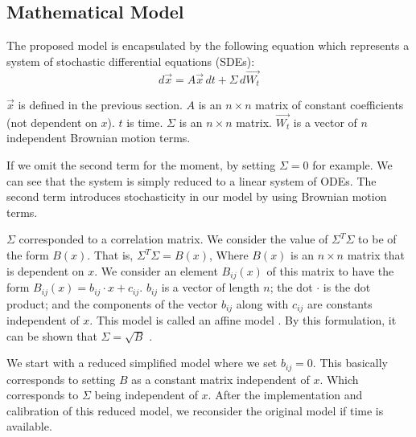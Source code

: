 \subsection{Mathematical Model}
\label{sec:model}
The proposed model is encapsulated by the following equation which represents a system of stochastic differential equations (SDEs):
\begin{equation}
\label{eq:model}
d\vec{x} = A \vec{x} \, dt + \Sigma \, d\vec{W_t}
\end{equation}

$\vec{x}$  is defined in the previous section.
$A$ is an $n \times n$ matrix of constant coefficients (not dependent on $x$).
$t$ is time.
$\Sigma$ is an $n \times n$ matrix.
$\vec{W_t}$ is a vector of $n$ independent Brownian motion terms.

If we omit the second term for the moment,
by setting $\Sigma = 0$ for example.
We can see that the system is simply reduced to a linear system of ODEs.
The second term introduces stochasticity in our model by using Brownian motion terms.

$\Sigma$ corresponded to a correlation matrix.
We consider the value of $\Sigma^T \Sigma$ to be of the form $B(x)$.
That is, $\Sigma^T \Sigma = B(x)$,
Where $B(x)$ is an $n \times n$ matrix that is dependent on $x$.
We consider an element $B_{ij}(x)$ of this matrix to have the form
$B_{ij}(x) = b_{ij} \cdot x + c_{ij}$.
$b_{ij}$ is a vector of length $n$;
the dot $\cdot$ is the dot product;
and the components of the vector $b_{ij}$ along with $c_{ij}$ are constants independent of $x$.
This model is called an affine model \parencite{citation needed}.
By this formulation, it can be shown that $\Sigma = \sqrt{B}$ \parencite{citation needed}.

We start with a reduced simplified model where we set $b_{ij} = 0$.
This basically corresponds to setting $B$ as a constant matrix independent of $x$.
Which corresponds to $\Sigma$ being independent of $x$.
After the implementation and calibration of this reduced model,
we reconsider the original model if time is available.
